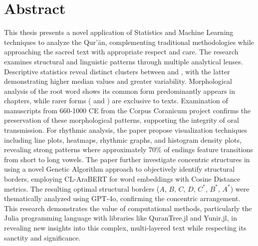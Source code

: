 \chapter*{Abstract}
This thesis presents a novel application of Statistics and Machine Learning techniques to analyze the Qur'\=an, complementing traditional methodologies while approaching the sacred text with appropriate respect and care. The research examines structural and linguistic patterns through multiple analytical lenses. Descriptive statistics reveal distinct clusters between   and    , with the latter demonstrating higher median values and greater variability. Morphological analysis of the root word   shows its common form   predominantly appears in   chapters, while rarer forms (  and  ) are exclusive to   texts. Examination of manuscripts from 660-1000 CE from the Corpus Coranicum project confirms the preservation of these morphological patterns, supporting the integrity of oral transmission. For rhythmic analysis, the paper propose visualization techniques including line plots, heatmaps, rhythmic graphs, and histogram density plots, revealing strong patterns where approximately 70\% of   endings feature transitions from short to long vowels. The paper further investigate concentric structures in   using a novel Genetic Algorithm approach to objectively identify structural borders, employing CL-AraBERT for word embeddings with Cosine Distance metrics. The resulting optimal structural borders ($A$, $B$, $C$, $D$, $C^*$, $B^*$, $A^*$) were thematically analyzed using GPT-4o, confirming the concentric arrangement. This research demonstrates the value of computational methods, particularly the Julia programming language with libraries like QuranTree.jl and Yunir.jl, in revealing new insights into this complex, multi-layered text while respecting its sanctity and significance.
